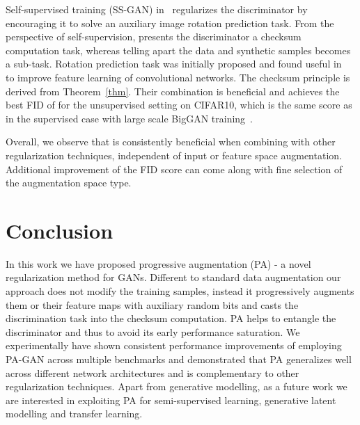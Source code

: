 \documentclass{article}
\begin{document}
Self-supervised training (SS-GAN) in~\cite{ChenSS2019} regularizes the discriminator by encouraging it to solve an auxiliary image rotation prediction task. From the perspective of self-supervision,  presents the discriminator a checksum computation task, whereas telling apart the data and synthetic samples becomes a sub-task. Rotation prediction task was initially proposed and found useful in~\cite{Gidaris2018} to improve feature learning of convolutional networks. The checksum principle is derived from Theorem~\ref{thm}. Their combination is beneficial and achieves the best FID of  for the unsupervised setting on CIFAR10, which is the same score as in the supervised case with large scale BigGAN training~\cite{Brock2019}. 

Overall, we observe that  is consistently beneficial when combining with other regularization techniques, independent of input or feature space augmentation. Additional improvement of the FID score can come along with fine selection of the augmentation space type. 


 \section{\label{sec:Conclusion}Conclusion}
In this work we have proposed progressive augmentation (PA) -  a novel regularization method for GANs. Different to standard data augmentation our approach does not modify the training samples, instead it progressively augments them or their feature maps with auxiliary random bits and casts the discrimination task into the checksum computation. PA helps to entangle the discriminator and thus to avoid its early performance saturation. We experimentally have shown consistent performance improvements of employing PA-GAN across multiple benchmarks and demonstrated that PA generalizes well across different network architectures and is complementary to other regularization techniques. Apart from generative modelling, as a future work we are interested in exploiting PA for semi-supervised learning, generative latent modelling and transfer learning.
 
\end{document}
